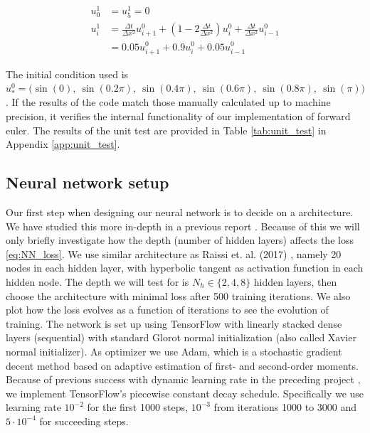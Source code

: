 \documentclass[12pt]{extarticle}
\begin{document}
\begin{align*}
	u_0^1 &= u_5^1 = 0 \\
	u_i^1 &= \frac{\Delta t}{\Delta x^2}u_{i+1}^0 + (1 - 2\frac{\Delta t}{\Delta x^2})u_i^0 + \frac{\Delta t}{\Delta x^2}u_{i-1}^0 \\
	&= 0.05u_{i+1}^0 + 0.9u_i^0 + 0.05u_{i-1}^0
\end{align*}

The initial condition used is $u_*^0 = \big(\sin(0),\:\sin(0.2\pi),\:\sin(0.4\pi),\:\sin(0.6\pi), \:\sin(0.8\pi),\:\sin(\pi)\big)$. If the results of the code match those manually calculated up to machine precision, it verifies the internal functionality of our implementation of forward euler. The results of the unit test are provided in Table \ref{tab:unit_test} in Appendix \ref{app:unit_test}.



\subsection{Neural network setup}

Our first step when designing our neural network is to decide on a architecture. We have studied this more in-depth in a previous report \cite{project2}. Because of this we will only briefly investigate how the depth (number of hidden layers) affects the loss \eqref{eq:NN_loss}. We use similar architecture as Raissi et. al. (2017) \cite{raissi2017physics}, namely 20 nodes in each hidden layer, with hyperbolic tangent as activation function in each hidden node. The depth we will test for is $N_h\in\{2,4,8\}$ hidden layers, then choose the architecture with minimal loss after 500 training iterations. We also plot how the loss evolves as a function of iterations to see the evolution of training. The network is set up using TensorFlow with linearly stacked dense layers (sequential) with standard Glorot normal initialization (also called Xavier normal initializer). As optimizer we use Adam, which is a stochastic gradient decent method based on adaptive estimation of first- and second-order moments. Because of previous success with dynamic learning rate in the preceding project \cite{project2}, we implement TensorFlow's piecewise constant decay schedule. Specifically we use learning rate $10^{-2}$ for the first 1000 steps, $10^{-3}$ from iterations 1000 to 3000 and $5 \cdot 10^{-4}$ for succeeding steps.
\end{document}
